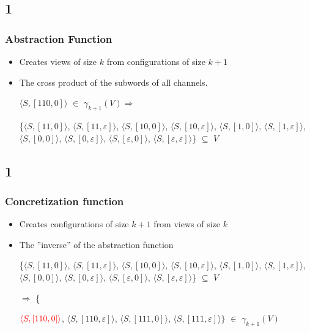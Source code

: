 \documentclass[handout]{beamer}
\begin{document}
\subsection*{1}
\begin{frame}
  \frametitle{Abstraction Function}
  \begin{itemize}
  \item
    Creates views of size $k$ from configurations of size $k+1$
  \item
    The cross product of the subwords of all channels.

    \begin{example}[$\alpha$ for ABP with $k=2$]

    $\langle S, [110,0]\rangle$ $\in$ $\gamma_{k+1}(V) \Rightarrow$

    \{$\langle S, [11, 0]\rangle$, $\langle S, [11, \varepsilon]\rangle$, $\langle S, [10, 0]\rangle$, $\langle S, [10, \varepsilon]\rangle$, $\langle S, [1, 0]\rangle$, $\langle S, [1,\varepsilon ]\rangle$, $\langle S,[0,0]\rangle$, $\langle S, [0,\varepsilon]\rangle$, $\langle S, [\varepsilon, 0]\rangle$, $\langle S, [\varepsilon, \varepsilon]\rangle$\} $\subseteq$ $V$

    \end{example}
  \end{itemize}
\end{frame}

\subsection*{1}
\begin{frame}
  \frametitle{Concretization function}
  \begin{itemize}
  \item
    Creates configurations of size $k+1$ from views of size $k$
  \item
    The ''inverse'' of the abstraction function

    \begin{example}[$\gamma$ for ABP with $k=2$]


    \{$\langle S, [11, 0]\rangle$, $\langle S, [11, \varepsilon]\rangle$, $\langle S, [10, 0]\rangle$, $\langle S, [10, \varepsilon]\rangle$, $\langle S, [1, 0]\rangle$, $\langle S, [1,\varepsilon ]\rangle$, $\langle S,[0,0]\rangle$, $\langle S, [0,\varepsilon]\rangle$, $\langle S, [\varepsilon, 0]\rangle$, $\langle S, [\varepsilon, \varepsilon]\rangle$\} $\subseteq$ $V$

  $\Rightarrow$ \{

${\color{red}\langle S, [110,0]\rangle}$,
  $\langle S, [110,\varepsilon]\rangle$,
$\langle S, [111,0]\rangle$,
$\langle S, [111,\varepsilon]\rangle\}$
$\in$ $\gamma_{k+1}(V)$
    \end{example}
  \end{itemize}
\end{frame}
\end{document}

